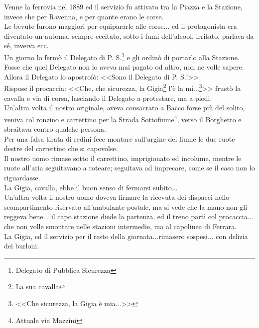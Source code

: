 \indent Venne la ferrovia nel 1889 ed il servizio fu attivato tra la Piazza e la Stazione, invece che per Ravenna, e per quante erano le corse.\\
\indent Le bevute furono maggiori per equipararle alle corse... ed il protagonista era diventato un automa, sempre eccitato, sotto i fumi dell'alcool, irritato, parlava da sé, inveiva ecc.\\
\indent Un giorno lo fermò il Delegato di P. S.\footnote{Delegato di Pubblica Sicurezza} e gli ordinò di portarlo alla Stazione. Fosse che quel Delegato non lo aveva mai pagato od altro, non ne volle sapere.\\
\indent Allora il Delegato lo apostrofò: <<Sono il Delegato di P. S.!>>\\
\indent Rispose il procaccia: <<Che, che sicurezza, la Gigia\footnote{La sua cavalla} l'è la mi...\footnote{<<Che sicurezza, la Gigia è mia...>>}>> frustò la cavalla e via di corsa, lasciando il Delegato a protestare, ma a piedi.\\
\indent Un'altra volta il nostro originale, aveva consacrato a Bacco forse più del solito, veniva col ronzino e carrettino per la Strada Sottofiume\footnote{Attuale via Mazzini}, verso il Borghetto e sbraitava contro qualche persona.\\
\indent Per una falsa tirata di redini fece montare sull'argine del fiume le due ruote destre del carrettino che si capovolse.\\
\indent Il nostro uomo rimase sotto il carrettino, imprigionato ed incolume, mentre le ruote all'aria seguitavano a roteare; seguitava ad imprecare, come se il caso non lo riguardasse.\\
\indent La Gigia, cavalla, ebbe il buon senso di fermarsi subito...\\
\indent Un'altra volta il nostro uomo doveva firmare la ricevuta dei dispacci nello scompartimento riservato all'ambulante postale, ma si vede che la mano non gli reggeva bene... il capo stazione diede la partenza, ed il treno partì col procaccia... che non volle smontare nelle stazioni intermedie, ma al capolinea di Ferrara.\\
\indent La Gigia, ed il servizio per il resto della giornata...rimasero sospesi... con delizia dei burloni. \\












































%
